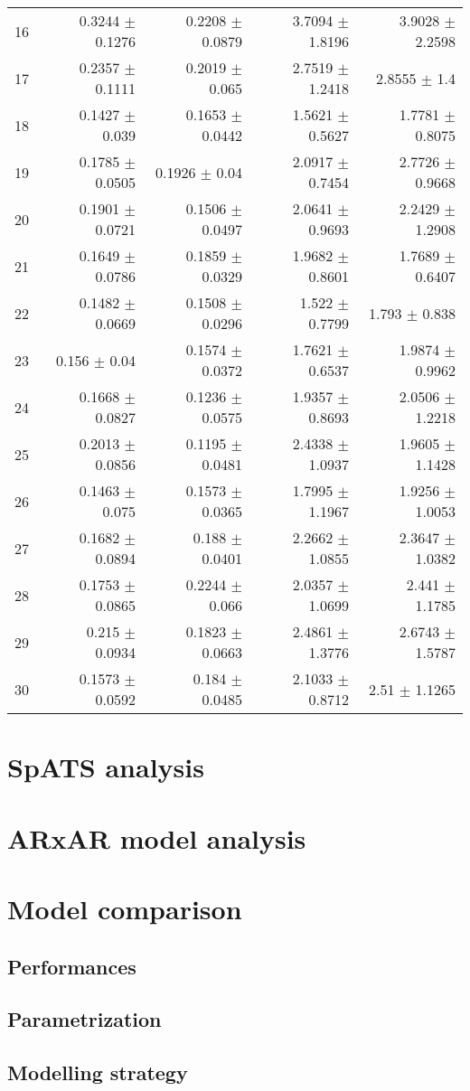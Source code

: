 \begin{table}[ht]
\begin{tabular}{lrrrr}
  16 & 0.3244 $\pm$ 0.1276 & 0.2208 $\pm$ 0.0879 & 3.7094 $\pm$ 1.8196 & 3.9028 $\pm$ 2.2598 \\ 
  17 & 0.2357 $\pm$ 0.1111 & 0.2019 $\pm$ 0.065 & 2.7519 $\pm$ 1.2418 & 2.8555 $\pm$ 1.4 \\ 
  18 & 0.1427 $\pm$ 0.039 & 0.1653 $\pm$ 0.0442 & 1.5621 $\pm$ 0.5627 & 1.7781 $\pm$ 0.8075 \\ 
  19 & 0.1785 $\pm$ 0.0505 & 0.1926 $\pm$ 0.04 & 2.0917 $\pm$ 0.7454 & 2.7726 $\pm$ 0.9668 \\ 
  20 & 0.1901 $\pm$ 0.0721 & 0.1506 $\pm$ 0.0497 & 2.0641 $\pm$ 0.9693 & 2.2429 $\pm$ 1.2908 \\ 
  21 & 0.1649 $\pm$ 0.0786 & 0.1859 $\pm$ 0.0329 & 1.9682 $\pm$ 0.8601 & 1.7689 $\pm$ 0.6407 \\ 
  22 & 0.1482 $\pm$ 0.0669 & 0.1508 $\pm$ 0.0296 & 1.522 $\pm$ 0.7799 & 1.793 $\pm$ 0.838 \\ 
  23 & 0.156 $\pm$ 0.04 & 0.1574 $\pm$ 0.0372 & 1.7621 $\pm$ 0.6537 & 1.9874 $\pm$ 0.9962 \\ 
  24 & 0.1668 $\pm$ 0.0827 & 0.1236 $\pm$ 0.0575 & 1.9357 $\pm$ 0.8693 & 2.0506 $\pm$ 1.2218 \\ 
  25 & 0.2013 $\pm$ 0.0856 & 0.1195 $\pm$ 0.0481 & 2.4338 $\pm$ 1.0937 & 1.9605 $\pm$ 1.1428 \\ 
  26 & 0.1463 $\pm$ 0.075 & 0.1573 $\pm$ 0.0365 & 1.7995 $\pm$ 1.1967 & 1.9256 $\pm$ 1.0053 \\ 
  27 & 0.1682 $\pm$ 0.0894 & 0.188 $\pm$ 0.0401 & 2.2662 $\pm$ 1.0855 & 2.3647 $\pm$ 1.0382 \\ 
  28 & 0.1753 $\pm$ 0.0865 & 0.2244 $\pm$ 0.066 & 2.0357 $\pm$ 1.0699 & 2.441 $\pm$ 1.1785 \\ 
  29 & 0.215 $\pm$ 0.0934 & 0.1823 $\pm$ 0.0663 & 2.4861 $\pm$ 1.3776 & 2.6743 $\pm$ 1.5787 \\ 
  30 & 0.1573 $\pm$ 0.0592 & 0.184 $\pm$ 0.0485 & 2.1033 $\pm$ 0.8712 & 2.51 $\pm$ 1.1265 \\ 
   \bottomrule
\end{tabular}
\label{tab:summary_table_all_variables}
\end{table}



\section{SpATS analysis}
\section{ARxAR model analysis}
\section{Model comparison}
\subsection{Performances}
\subsection{Parametrization}
\subsection{Modelling strategy}
